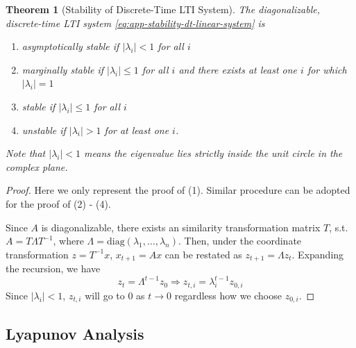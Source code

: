 \documentclass[
]{book}
\newtheorem{theorem}{Theorem}[chapter]
\theoremstyle{definition}
\theoremstyle{definition}
\theoremstyle{definition}
\theoremstyle{definition}
\theoremstyle{remark}
\begin{document}
\begin{theorem}[Stability of Discrete-Time LTI System]
\protect\hypertarget{thm:dtltisystemstability}{}\label{thm:dtltisystemstability}The diagonalizable, discrete-time LTI system \eqref{eq:app-stability-dt-linear-system} is

\begin{enumerate}
\def\labelenumi{\arabic{enumi}.}
\item
  asymptotically stable if \(|\lambda_i| < 1\) for all \(i\)
\item
  marginally stable if \(|\lambda_i| \leq 1\) for all \(i\) and there exists at least one \(i\) for which \(|\lambda_i| = 1\)
\item
  stable if \(|\lambda_i| \leq 1\) for all \(i\)
\item
  unstable if \(|\lambda_i| > 1\) for at least one \(i\).
\end{enumerate}

Note that \(|\lambda_i| < 1\) means the eigenvalue lies strictly inside the unit circle in the complex plane.
\end{theorem}

\begin{proof}
Here we only represent the proof of (1). Similar procedure can be adopted for the proof of (2) - (4).

Since \(A\) is diagonalizable, there exists an similarity transformation matrix \(T\), s.t. \(A = T \Lambda T^{-1}\), where \(\Lambda = \text{diag}(\lambda_1, \dots, \lambda_n)\). Then, under the coordinate transformation \(z = T^{-1} x\), \(x_{t+1} = Ax\) can be restated as \(z_{t+1} = \Lambda z_t\). Expanding the recursion, we have
\begin{equation*}
   z_{t} = \Lambda^{t-1} z_0 \Longrightarrow
   z_{t,i} = \lambda_i^{t-1} z_{0,i}
\end{equation*}
Since \(|\lambda_i| < 1\), \(z_{t,i}\) will go to \(0\) as \(t \rightarrow 0\) regardless how we choose \(z_{0,i}\).
\end{proof}

\hypertarget{lyapunov-analysis-1}{%
\subsection{Lyapunov Analysis}\label{lyapunov-analysis-1}}
\end{document}
